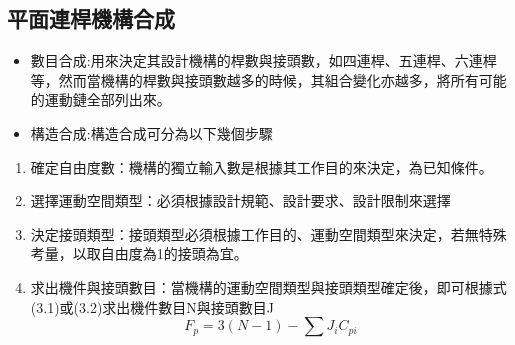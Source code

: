 \documentclass[14pt,a4paper]{report}  %
\newcommand{\fourteen}{\fontsize{14pt}{\baselineskip}\selectfont}%
\begin{document}
{      \subsection{平面連桿機構合成}
      \fourteen{進行機構設計與合成主要流程分為數目合成、構造合成、尺寸合成與運動學模擬，合成皆有其順序性存在，而運動學模擬則是進行分析前面的合成項目。}
      \begin{itemize} 
      \item 數目合成:用來決定其設計機構的桿數與接頭數，如四連桿、五連桿、六連桿等，然而當機構的桿數與接頭數越多的時候，其組合變化亦越多，將所有可能的運動鏈全部列出來。
      \item 構造合成:構造合成可分為以下幾個步驟
      \end{itemize} 
      \begin{enumerate}
      \item 確定自由度數：機構的獨立輸入數是根據其工作目的來決定，為已知條件。
      \item 選擇運動空間類型：必須根據設計規範、設計要求、設計限制來選擇
      \item 決定接頭類型：接頭類型必須根據工作目的、運動空間類型來決定，若無特殊考量，以取自由度為1的接頭為宜。
      \item 求出機件與接頭數目：當機構的運動空間類型與接頭類型確定後，即可根據式(3.1)或(3.2)求出機件數目N與接頭數目J
      \hspace*{\fill} \\
      
      \begin{equation}
      F_{p}=3\left ( N-1 \right )-\sum J_{i}C_{pi}
      \end{equation}  
      

\end{enumerate}}
\end{document}
